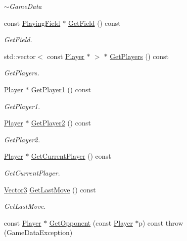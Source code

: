 \begin{DoxyCompactItemize}
\begin{DoxyCompactList}\small\item\em $\sim$\-Game\-Data \end{DoxyCompactList}\item 
const \hyperlink{classPlayingField}{Playing\-Field} $\ast$ \hyperlink{classGameData_a329cd2c493f221145b4edb0ade09e4ff}{Get\-Field} () const 
\begin{DoxyCompactList}\small\item\em Get\-Field. \end{DoxyCompactList}\item 
std\-::vector$<$ const \hyperlink{classPlayer}{Player} $\ast$ $>$ $\ast$ \hyperlink{classGameData_ad74e6fd23e5784414d35731dc33ff44a}{Get\-Players} () const 
\begin{DoxyCompactList}\small\item\em Get\-Players. \end{DoxyCompactList}\item 
\hyperlink{classPlayer}{Player} $\ast$ \hyperlink{classGameData_aa540b341a37637f84d4e4790e52a1f31}{Get\-Player1} () const 
\begin{DoxyCompactList}\small\item\em Get\-Player1. \end{DoxyCompactList}\item 
\hyperlink{classPlayer}{Player} $\ast$ \hyperlink{classGameData_af1ad732b7f7706c36044113111b0834f}{Get\-Player2} () const 
\begin{DoxyCompactList}\small\item\em Get\-Player2. \end{DoxyCompactList}\item 
\hyperlink{classPlayer}{Player} $\ast$ \hyperlink{classGameData_a43e9d7b67d8f421809a7f3635a9021b3}{Get\-Current\-Player} () const 
\begin{DoxyCompactList}\small\item\em Get\-Current\-Player. \end{DoxyCompactList}\item 
\hyperlink{structVector3}{Vector3} \hyperlink{classGameData_a5c754d78e1521b2b32b53a083d5cf7f5}{Get\-Last\-Move} () const 
\begin{DoxyCompactList}\small\item\em Get\-Last\-Move. \end{DoxyCompactList}\item 
const \hyperlink{classPlayer}{Player} $\ast$ \hyperlink{classGameData_a7237b89655e73601a90762ea9ccbd3ac}{Get\-Opponent} (const \hyperlink{classPlayer}{Player} $\ast$p) const   throw (\-Game\-Data\-Exception)

\end{DoxyCompactItemize}
